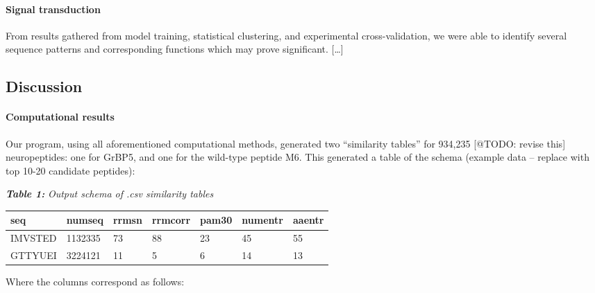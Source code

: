 \documentclass[]{article}
\let\oldparagraph\paragraph
\renewcommand{\paragraph}[1]{\oldparagraph{#1}\mbox{}}
\begin{document}
	\hypertarget{signal-transduction}{%
		\paragraph{Signal transduction}\label{signal-transduction}}
	
	From results gathered from model training, statistical clustering, and
	experimental cross-validation, we were able to identify several sequence
	patterns and corresponding functions which may prove significant.
	{[}\ldots{}{]}
	
	\hypertarget{discussion}{%
		\subsection{Discussion}\label{discussion}}
	
	\hypertarget{computational-results}{%
		\paragraph{Computational results}\label{computational-results}}
	
	Our program, using all aforementioned computational methods, generated
	two ``similarity tables'' for 934,235 {[}@TODO: revise this{]}
	neuropeptides: one for GrBP5, and one for the wild-type peptide M6. This
	generated a table of the schema (example data -- replace with top 10-20
	candidate peptides):
	
	\textbf{\emph{Table 1:}} \emph{Output schema of .csv similarity tables}
	
	\begin{longtable}[]{@{}lllllll@{}}
		\toprule
		\textbf{seq} & numseq & rrmsn & rrmcorr & pam30 & numentr &
		aaentr\tabularnewline
		\midrule
		\endhead
		IMVSTED & 1132335 & 73 & 88 & 23 & 45 & 55\tabularnewline
		GTTYUEI & 3224121 & 11 & 5 & 6 & 14 & 13\tabularnewline
		\bottomrule
	\end{longtable}
	
	Where the columns correspond as follows:
	
\end{document}
